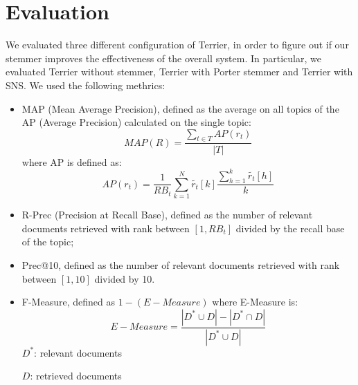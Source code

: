 \section{Evaluation}
We evaluated three different configuration of Terrier, in order to figure out if our stemmer improves the effectiveness of the overall system. In particular, we evaluated Terrier without stemmer, Terrier with Porter stemmer and Terrier with SNS. We used the following methrics:

\begin{itemize}
\item MAP (Mean Average Precision), defined as the average on all topics of the AP (Average Precision) calculated on the single topic:
\begin{equation}
MAP(R) = \frac{\sum_{t \in T}AP(r_t)}{|T|}
\end{equation}
where AP is defined as:
\begin{equation}
AP(r_t)=\frac{1}{RB_t}\sum_{k=1}^{N}\widetilde{r_t}[k]\frac{\sum_{h=1}^{k}\widetilde{r_t}[h]}{k}
\end{equation}

\item R-Prec (Precision at Recall Base), defined as the number of relevant documents retrieved with rank between $[1,RB_t]$ divided by the recall base of the topic;

\item Prec@10, defined as the number of relevant documents retrieved with rank between $[1, 10]$ divided by 10.

\item F-Measure, defined as $1 - (E-Measure)$ where E-Measure is:
\begin{equation}
E-Measure=\frac{|D^{*}\cup D|-|D^{*}\cap D|}{|D^{*}\cup D|}
\end{equation}
$D^{*}$: relevant documents

$D$: retrieved documents

\end{itemize}
